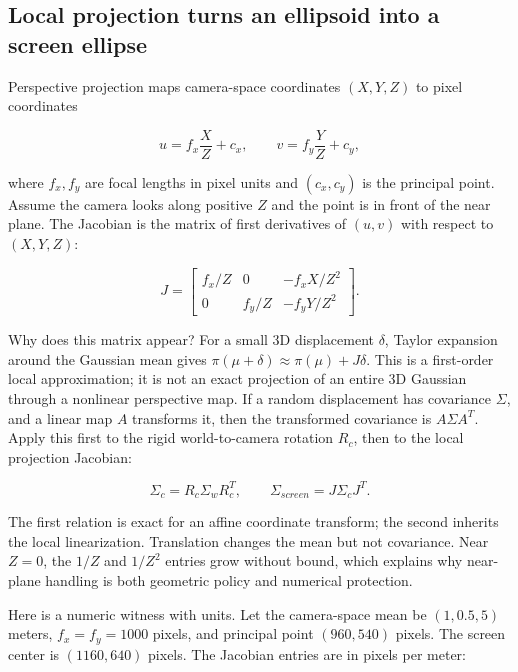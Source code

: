 \subsection{Local projection turns an ellipsoid into a screen ellipse}\label{04-visual-computing-ii-ch037-local-projection-turns-an-ellipsoid-into-a-screen-ellipse}

\hypertarget{04-visual-computing-ii-ch037-local-projection-turns-an-ellipsoid-into-a-screen-ellipse}{}

Perspective projection maps camera-space coordinates \((X,Y,Z)\) to pixel coordinates

\[
u=f_x\frac XZ+c_x,\qquad v=f_y\frac YZ+c_y,
\]

where \(f_x,f_y\) are focal lengths in pixel units and \((c_x,c_y)\) is the principal point. Assume the camera looks along positive \(Z\) and the point is in front of the near plane. The Jacobian is the matrix of first derivatives of \((u,v)\) with respect to \((X,Y,Z)\):

\[
J=\begin{bmatrix}
f_x/Z&0&-f_xX/Z^2\\
0&f_y/Z&-f_yY/Z^2
\end{bmatrix}.
\]

Why does this matrix appear? For a small 3D displacement \(\delta\), Taylor expansion around the Gaussian mean gives \(\pi(\mu+\delta)\approx\pi(\mu)+J\delta\). This is a first-order local approximation; it is not an exact projection of an entire 3D Gaussian through a nonlinear perspective map. If a random displacement has covariance \(\Sigma\), and a linear map \(A\) transforms it, then the transformed covariance is \(A\Sigma A^T\). Apply this first to the rigid world-to-camera rotation \(R_c\), then to the local projection Jacobian:

\[
\Sigma_c=R_c\Sigma_wR_c^T,
\qquad
\Sigma_{screen}=J\Sigma_cJ^T.
\]

The first relation is exact for an affine coordinate transform; the second inherits the local linearization. Translation changes the mean but not covariance. Near \(Z=0\), the \(1/Z\) and \(1/Z^2\) entries grow without bound, which explains why near-plane handling is both geometric policy and numerical protection.

Here is a numeric witness with units. Let the camera-space mean be \((1,0.5,5)\) meters, \(f_x=f_y=1000\) pixels, and principal point \((960,540)\) pixels. The screen center is \((1160,640)\) pixels. The Jacobian entries are in pixels per meter:

